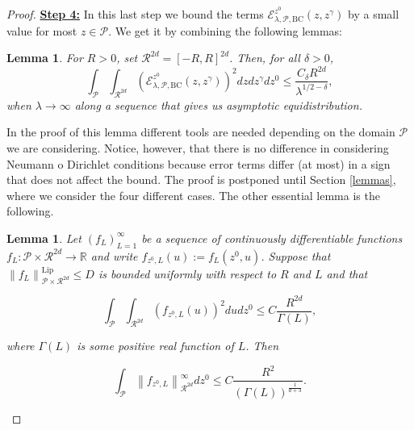 \documentclass{amsart}
\newtheorem{lemma}[theorem]{Lemma}
\theoremstyle{definition}
\theoremstyle{remark}
\renewcommand\leq\leqslant
\numberwithin{equation}{section}
\theoremstyle{definition}
\theoremstyle{remark}
\begin{document}
\begin{proof}
\textbf{	\underline{Step 4:}}
	In this last step we bound the terms $\mathcal{E}_{\lambda,\mathcal{P},\mathrm{BC}}^{z^0}(z,z^\gamma)$ by a small value for most $z\in\mathcal{P}$. We get it by combining the following lemmas:
	\begin{lemma}\label{BoundOfNonTrans}
		For $R>0$, set $\mathcal{R}^{2d}=[-R,R]^{2d}$. Then, for all $\delta>0$, \begin{equation}
			\int_{\mathcal{P}}\int_{\mathcal{R}^{2d}}\left(\mathcal{E}_{\lambda,\mathcal{P},\mathrm{BC}}^{z^0}(z,z^\gamma)\right)^2dzdz^\gamma dz^0\leq\frac{C_\delta R^{2d}}{\lambda^{1/2-\delta}},
		\end{equation}when $\lambda\rightarrow \infty$ along a sequence that gives us asymptotic equidistribution.
	\end{lemma}
	In the proof of this lemma different tools are needed depending on the domain $\mathcal{P}$ we are considering. Notice, however, that there is no difference in considering Neumann o Dirichlet conditions because error terms differ (at most) in a sign that does not affect the bound. The proof is postponed until Section \ref{lemmas}, where we consider the four different cases. The other essential lemma is the following.
	
	\begin{lemma}\label{finalbound}
		Let $\left(f_L\right)_{L=1}^\infty$ be a sequence of continuously differentiable functions $f_L: \mathcal{P}\times \mathcal{R}^{2d} \rightarrow \mathbb{R}$ and write $f_{z^0, L}(u):=f_L(z^0, u)$. Suppose that $\left\|f_L\right\|_{\mathcal{P} \times \mathcal{R}^{2d}}^{\mathrm{Lip}} \leq D$ is bounded uniformly with respect to $R$ and $L$ and that
		
		\begin{equation}
			\int_{\mathcal{P}}\int_{\mathcal{R}^{2d}}\left(f_{z^0, L}(u)\right)^2 d u d z^0 \leq C \frac{R^{2d}}{\Gamma(L)},
		\end{equation}
		
		where $\Gamma(L)$ is some positive real function of $L$. Then
		
		\begin{equation}
			\int_{\mathcal{P}}\left\|f_{z^0, L}\right\|_{\mathcal{R}^{2d}}^{\infty} d z^0 \leq C \frac{R^{2}}{(\Gamma(L))^{\frac{1}{d+3}}}.
		\end{equation}
		

\end{lemma}
\end{proof}
\end{document}
